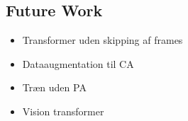 \documentclass[./main.tex]{subfiles}
\begin{document}
\subsection{Future Work}
\begin{itemize}
    \item Transformer uden skipping af frames 
    \item Dataaugmentation til CA
    \item Træn uden PA
    \item Vision transformer
\end{itemize}
\end{document}
